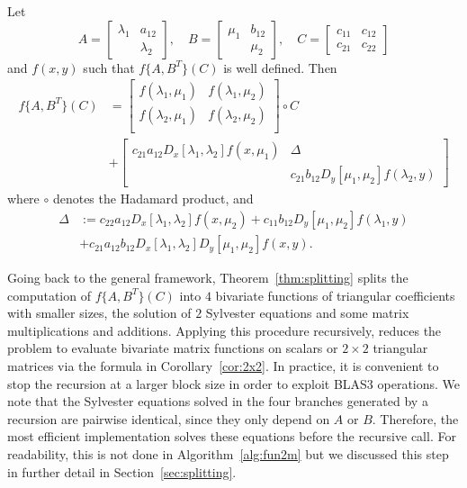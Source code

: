 \documentclass{siamart1116}
\begin{document}
\begin{corollary} \label{cor:2x2}
	Let 
	\[
	A=\begin{bmatrix}
	\lambda_1&a_{12}\\ &\lambda_2
	\end{bmatrix},\quad B=\begin{bmatrix}
	\mu_1&b_{12}\\ &\mu_2
	\end{bmatrix}
	,\quad C=\begin{bmatrix}
	c_{11}&c_{12}\\ c_{21}&c_{22}
	\end{bmatrix}
	\]
	and $f(x,y)$ such that $f\{A,B^T\}(C)$ is well defined. Then
	\begin{align*}
	f\{A,B^T\}(C)&= %
	\begin{bmatrix}
	  f(\lambda_1, \mu_1) & f(\lambda_1, \mu_2) \\
	  f(\lambda_2, \mu_1) & f(\lambda_2, \mu_2) \\
	\end{bmatrix} \circ C \\
	&+\begin{bmatrix}
	c_{21}a_{12}D_x[\lambda_1, \lambda_2]f(x,\mu_1) & \Delta\\
	& c_{21}b_{12}D_y[\mu_1,\mu_2]f(\lambda_2,y)
	\end{bmatrix}
	\end{align*}	
	where $\circ$ denotes the Hadamard product, 
	and \begin{align*}\Delta&:= c_{22}a_{12}D_x[\lambda_1, \lambda_2]f(x,\mu_2)+c_{11}b_{12}D_y[\mu_1,\mu_2]f(\lambda_1,y)\\ &+c_{21}a_{12}b_{12}D_{x}[\lambda_1,\lambda_2]D_{y}[\mu_1,\mu_2]f(x,y).\end{align*}
	\end{corollary}

Going back to the general framework, 
Theorem~\ref{thm:splitting} splits the computation of 
$f\{A,B^T\}(C)$ into $4$ bivariate functions of triangular
coefficients with smaller sizes, the solution of $2$ 
Sylvester equations and some matrix multiplications and 
additions. Applying this procedure recursively, reduces the 
problem to evaluate bivariate matrix functions on scalars 
or $2\times 2$ triangular matrices via the formula 
in Corollary~\ref{cor:2x2}. In practice, it is convenient 
to stop the recursion at a larger block size in order to 
exploit BLAS3 operations.
We note that the Sylvester equations solved in the 
four branches generated by a recursion are pairwise 
identical, since they only depend on $A$ or $B$. Therefore, 
the most efficient implementation solves these equations 
before the recursive call. For readability, this is not 
done in Algorithm~\ref{alg:fun2m} but we  discussed 
this step in further detail in Section~\ref{sec:splitting}.  
\end{document}
